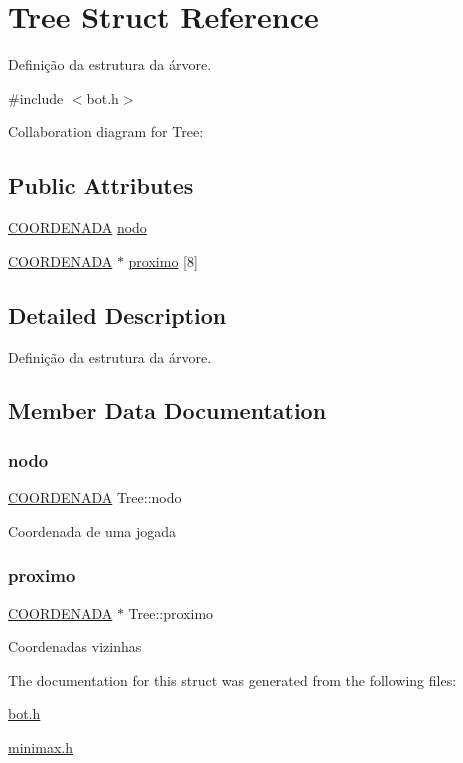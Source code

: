 \hypertarget{structTree}{}\section{Tree Struct Reference}
\label{structTree}


Definição da estrutura da árvore.  




{\ttfamily \#include $<$bot.\+h$>$}



Collaboration diagram for Tree\+:
\subsection*{Public Attributes}
\begin{DoxyCompactItemize}
\item 
\hyperlink{structCOORDENADA}{C\+O\+O\+R\+D\+E\+N\+A\+DA} \hyperlink{structTree_abc891f05ffdda2289c85cf805b12ab64}{nodo}
\item 
\hyperlink{structCOORDENADA}{C\+O\+O\+R\+D\+E\+N\+A\+DA} $\ast$ \hyperlink{structTree_a47973c3f53684bf12072870d6b5239fb}{proximo} \mbox{[}8\mbox{]}
\end{DoxyCompactItemize}


\subsection{Detailed Description}
Definição da estrutura da árvore. 

\subsection{Member Data Documentation}
\mbox{\label{structTree_abc891f05ffdda2289c85cf805b12ab64}} 
\subsubsection{\texorpdfstring{nodo}{nodo}}
{\footnotesize\ttfamily \hyperlink{structCOORDENADA}{C\+O\+O\+R\+D\+E\+N\+A\+DA} Tree\+::nodo}

Coordenada de uma jogada \mbox{\label{structTree_a47973c3f53684bf12072870d6b5239fb}} 
\subsubsection{\texorpdfstring{proximo}{proximo}}
{\footnotesize\ttfamily \hyperlink{structCOORDENADA}{C\+O\+O\+R\+D\+E\+N\+A\+DA} $\ast$ Tree\+::proximo}

Coordenadas vizinhas 

The documentation for this struct was generated from the following files\+:\begin{DoxyCompactItemize}
\item 
\hyperlink{bot_8h}{bot.\+h}\item 
\hyperlink{minimax_8h}{minimax.\+h}\end{DoxyCompactItemize}
